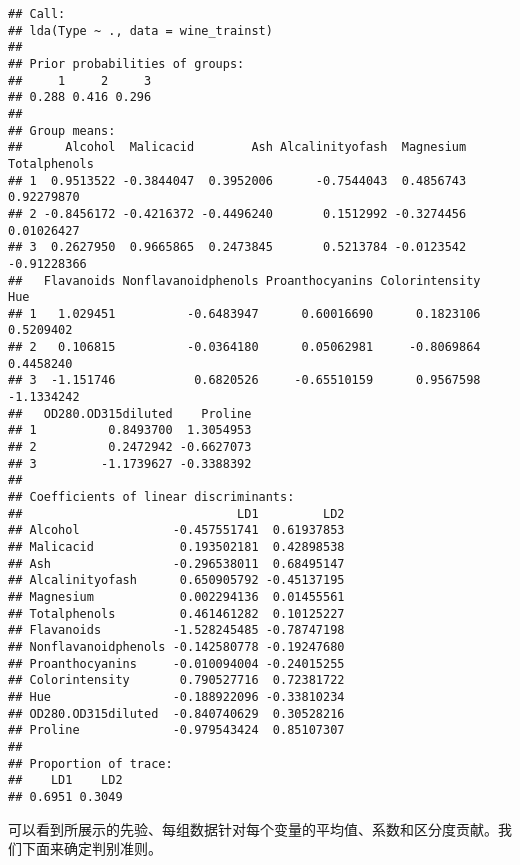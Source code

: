\documentclass[]{article}
\begin{document}
\begin{verbatim}
## Call:
## lda(Type ~ ., data = wine_trainst)
## 
## Prior probabilities of groups:
##     1     2     3 
## 0.288 0.416 0.296 
## 
## Group means:
##      Alcohol  Malicacid        Ash Alcalinityofash  Magnesium Totalphenols
## 1  0.9513522 -0.3844047  0.3952006      -0.7544043  0.4856743   0.92279870
## 2 -0.8456172 -0.4216372 -0.4496240       0.1512992 -0.3274456   0.01026427
## 3  0.2627950  0.9665865  0.2473845       0.5213784 -0.0123542  -0.91228366
##   Flavanoids Nonflavanoidphenols Proanthocyanins Colorintensity        Hue
## 1   1.029451          -0.6483947      0.60016690      0.1823106  0.5209402
## 2   0.106815          -0.0364180      0.05062981     -0.8069864  0.4458240
## 3  -1.151746           0.6820526     -0.65510159      0.9567598 -1.1334242
##   OD280.OD315diluted    Proline
## 1          0.8493700  1.3054953
## 2          0.2472942 -0.6627073
## 3         -1.1739627 -0.3388392
## 
## Coefficients of linear discriminants:
##                              LD1         LD2
## Alcohol             -0.457551741  0.61937853
## Malicacid            0.193502181  0.42898538
## Ash                 -0.296538011  0.68495147
## Alcalinityofash      0.650905792 -0.45137195
## Magnesium            0.002294136  0.01455561
## Totalphenols         0.461461282  0.10125227
## Flavanoids          -1.528245485 -0.78747198
## Nonflavanoidphenols -0.142580778 -0.19247680
## Proanthocyanins     -0.010094004 -0.24015255
## Colorintensity       0.790527716  0.72381722
## Hue                 -0.188922096 -0.33810234
## OD280.OD315diluted  -0.840740629  0.30528216
## Proline             -0.979543424  0.85107307
## 
## Proportion of trace:
##    LD1    LD2 
## 0.6951 0.3049
\end{verbatim}

可以看到所展示的先验、每组数据针对每个变量的平均值、系数和区分度贡献。我们下面来确定判别准则。
\end{document}
